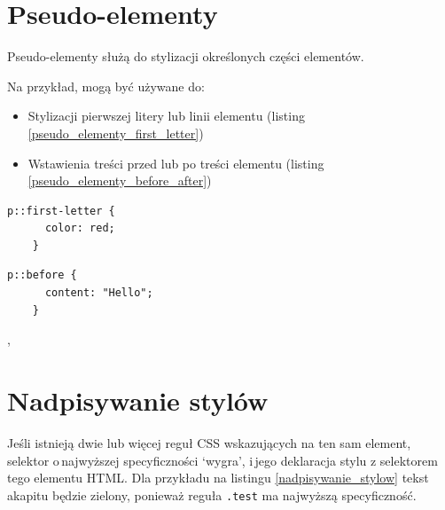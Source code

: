 \documentclass[a4paper,12pt]{book} %
\begin{document}

\section{Pseudo-elementy}

Pseudo-elementy służą do stylizacji określonych części elementów.

Na przykład, mogą być używane do:

\begin{itemize}
  \item Stylizacji pierwszej litery lub linii elementu (listing \ref{pseudo_elementy_first_letter})
  \item Wstawienia treści przed lub po treści elementu (listing \ref{pseudo_elementy_before_after})
\end{itemize}



\begin{lstfloat}[hb]
  \lstset{language=HTML}
  \begin{lstlisting}[frame=single]
    p::first-letter {
      color: red;
    }\end{lstlisting}

  \caption{Reguła z selektorem pierwszej litery każdego akapitu}
  \label{pseudo_elementy_first_letter}

\end{lstfloat}



\begin{lstfloat}[hb]
  \lstset{language=HTML}
  \begin{lstlisting}[frame=single]
    p::before {
      content: "Hello";
    }\end{lstlisting}
  \caption{Reguła dodająca napis \lstinline|Hello| do każdego akapitu},
  \label{pseudo_elementy_before_after}
\end{lstfloat}


\section{Nadpisywanie stylów}
Jeśli istnieją dwie lub więcej reguł CSS wskazujących na ten sam element, selektor o\,najwyższej specyficzności `wygra', i\,jego deklaracja stylu z selektorem tego elementu HTML.
Dla przykładu na listingu \ref{nadpisywanie_stylow} tekst akapitu będzie zielony, ponieważ reguła \lstinline{.test} ma najwyższą specyficzność.
\end{document}
